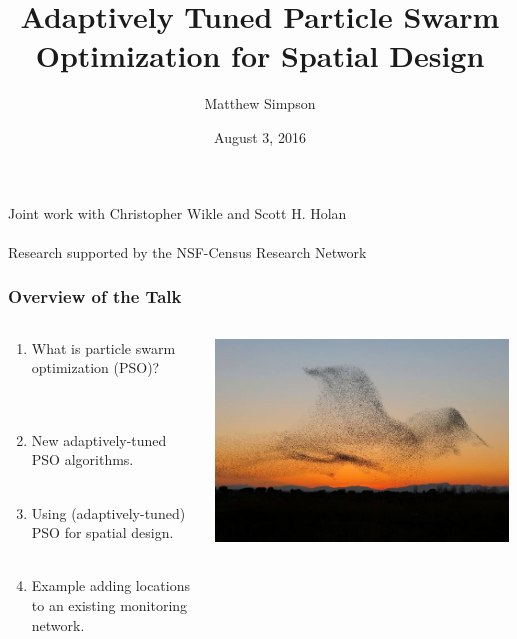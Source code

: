 \documentclass[xcolor=dvipsnames]{beamer}
\title[AT-PSO for Spatial Design]{Adaptively Tuned Particle Swarm Optimization for Spatial Design}
\author[Matt Simpson]{Matthew Simpson}
\institute[Mizzou Stat / SAS]{Department of Statistics, University of Missouri\\
                              SAS Institute, Inc.}
\date{August 3, 2016}
\begin{document}
\begin{frame}
\titlepage
\centering
{\scriptsize
Joint work with Christopher Wikle and Scott H. Holan\\~\\
Research supported by the NSF-Census Research Network}
\end{frame}

\begin{frame}
\frametitle{Overview of the Talk}
\begin{columns}
\begin{column}{0.5\textwidth}
\begin{enumerate}
\item What is particle swarm optimization (PSO)?\\
 \citep{blum2008swarm, clerc2010particle, clerc2011spso}\\~\\
\item New adaptively-tuned PSO algorithms.\\~\\
\item Using (adaptively-tuned) PSO for spatial design.\\~\\
\item Example adding locations to an existing monitoring network.
\end{enumerate}
\end{column}
\begin{column}{0.5\textwidth}
\includegraphics[width = 0.99\textwidth]{birds3.jpg}
\end{column}
\end{columns}
\end{frame}
\end{document}
